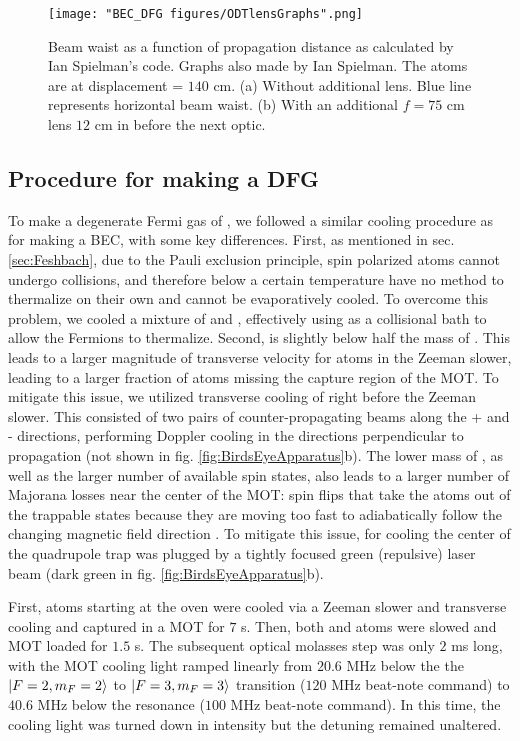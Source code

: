 \begin{figure}
	\texttt{[image: "BEC\_DFG figures/ODTlensGraphs".png]}
\caption[Beam waist as a function of propagation distance]{Beam waist as a function of propagation distance as calculated by Ian Spielman's code.  Graphs also made by Ian Spielman. The atoms are at displacement = $140$ cm. (a) Without additional lens. Blue line represents horizontal beam waist. (b) With an additional $f=75$ cm lens $12$ cm in before the next optic. }
\label{fig:ODTlensGraphs}
\end{figure}

\subsection{Procedure for making a DFG}\label{sec:DFGsequence}

To make a degenerate Fermi gas of \K{}, we followed a similar cooling procedure as for making a BEC, with some key differences. First, as mentioned in sec. \ref{sec:Feshbach}, due to the Pauli exclusion principle, spin polarized \K{} atoms cannot undergo \swave{}  collisions, and therefore below a certain temperature have no method to thermalize on their own and cannot be evaporatively cooled. To overcome this problem, we cooled a mixture of \Rb{} and \K{}, effectively using \Rb{} as a collisional bath to allow the Fermions to thermalize. Second, \K{} is slightly below half the mass of \Rb. This leads to a larger magnitude of transverse velocity for \K{} atoms in the Zeeman slower, leading to a larger fraction of atoms missing the capture region of the MOT. To mitigate this issue, we utilized transverse cooling of \K{} right before the Zeeman slower. This consisted of two pairs of counter-propagating beams along the \ez{}+\ey{} and \ez{}-\ey{} directions, performing Doppler cooling in the directions perpendicular to propagation (not shown in fig. \ref{fig:BirdsEyeApparatus}b). The lower mass of \K{}, as well as the larger number of available spin states, also leads to a larger number of Majorana losses near the center of the MOT: spin flips that take the atoms out of the trappable states because they are moving too fast to adiabatically follow the changing magnetic field direction \cite{Majorana1932,Sukumar1997, Brink2006}. To mitigate this issue, for cooling \K{} the center of the quadrupole trap was plugged by a tightly focused green (repulsive) laser beam (dark green in fig. \ref{fig:BirdsEyeApparatus}b).

First, \K{} atoms starting at the oven were cooled via a Zeeman slower and transverse cooling and captured in a MOT for $7$ s. Then, both \K{} and \Rb{} atoms were slowed and MOT loaded for $1.5$ s. The subsequent optical molasses step was only $2$ ms long, with the \Rb{} MOT cooling light ramped linearly from $20.6$ MHz below the the $\mathinner{|{F=2,m_F=2}\rangle}$ to $\mathinner{|{F=3,m_F=3}\rangle}$ transition ($120$ MHz beat-note command) to $40.6$ MHz below the resonance ($100$ MHz beat-note command). In this time, the \K{} cooling light was turned down in intensity but the detuning remained unaltered.

